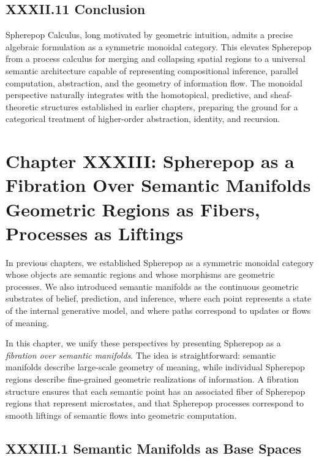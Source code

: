 \documentclass[11pt,letterpaper]{article}
\begin{document}
\subsection{XXXII.11 Conclusion}

Spherepop Calculus, long motivated by geometric intuition, admits a precise algebraic formulation as a symmetric monoidal category. This elevates Spherepop from a process calculus for merging and collapsing spatial regions to a universal semantic architecture capable of representing compositional inference, parallel computation, abstraction, and the geometry of information flow. The monoidal perspective naturally integrates with the homotopical, predictive, and sheaf-theoretic structures established in earlier chapters, preparing the ground for a categorical treatment of higher-order abstraction, identity, and recursion.

\newpage

\section{Chapter XXXIII: Spherepop as a Fibration Over Semantic Manifolds  
Geometric Regions as Fibers, Processes as Liftings}

In previous chapters, we established Spherepop as a symmetric monoidal category whose objects are semantic regions and whose morphisms are geometric processes. We also introduced semantic manifolds as the continuous geometric substrates of belief, prediction, and inference, where each point represents a state of the internal generative model, and where paths correspond to updates or flows of meaning.

In this chapter, we unify these perspectives by presenting Spherepop as a \emph{fibration over semantic manifolds}. The idea is straightforward: semantic manifolds describe large-scale geometry of meaning, while individual Spherepop regions describe fine-grained geometric realizations of information. A fibration structure ensures that each semantic point has an associated fiber of Spherepop regions that represent microstates, and that Spherepop processes correspond to smooth liftings of semantic flows into geometric computation.

\subsection{XXXIII.1 Semantic Manifolds as Base Spaces}
\end{document}
